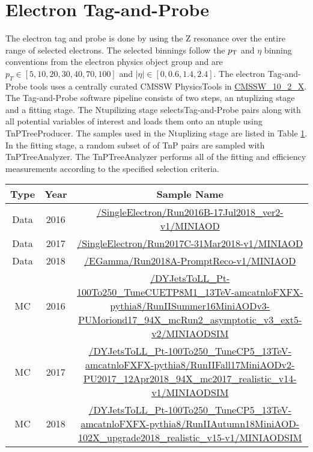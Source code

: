 
\FloatBarrier
\section{Electron Tag-and-Probe }

The electron tag and probe is done by using the Z resonance over the entire \pt range of selected electrons. The selected binnings follow the $p_{\mathrm{T}}$ and $\eta$ binning conventions from the electron physics object group and are $ p_T \in [5, 10, 20, 30, 40, 70, 100]$ and $|\eta| \in [ 0, 0.6, 1.4, 2.4]$. The electron Tag-and-Probe tools uses a centrally curated CMSSW PhysicsTools in \url{CMSSW_10_2_X}. The Tag-and-Probe software pipeline consists of two steps, an ntuplizing stage and a fitting stage. The  Ntupilizing stage selectsTag-and-Probe pairs along with all potential variables of interest and loads them onto an ntuple using TnPTreeProducer. The samples used in the Ntuplizing stage are listed in Table \ref{tab:electronTnPSamples}. In the fitting stage, a random subset of of TnP pairs are sampled with TnPTreeAnalyzer. The TnPTreeAnalyzer performs all of the fitting and efficiency measurements according to the specified selection criteria. 


\begin{table}
\scriptsize
\begin{tabular}{|c|c|c|}
\hline 
Type & Year & Sample Name \\ 
\hline 
Data & 2016 & \tiny \url{/SingleElectron/Run2016B-17Jul2018_ver2-v1/MINIAOD}  \\  
Data & 2017 & \tiny \url{/SingleElectron/Run2017C-31Mar2018-v1/MINIAOD} \\  
Data & 2018 & \tiny \url{/EGamma/Run2018A-PromptReco-v1/MINIAOD} \\ 
\hline 
MC & 2016 & \tiny \url{/DYJetsToLL_Pt-100To250_TuneCUETP8M1_13TeV-amcatnloFXFX-pythia8/RunIISummer16MiniAODv3-PUMoriond17_94X_mcRun2_asymptotic_v3_ext5-v2/MINIAODSIM} \\ 
MC & 2017 & \tiny \url{/DYJetsToLL_Pt-100To250_TuneCP5_13TeV-amcatnloFXFX-pythia8/RunIIFall17MiniAODv2-PU2017_12Apr2018_94X_mc2017_realistic_v14-v1/MINIAODSIM} \\ 
MC & 2018 & \tiny \url{/DYJetsToLL_Pt-100To250_TuneCP5_13TeV-amcatnloFXFX-pythia8/RunIIAutumn18MiniAOD-102X_upgrade2018_realistic_v15-v1/MINIAODSIM} \\ 
\hline
\end{tabular} 
\label{tab:electronTnPSamples}
\end{table}




